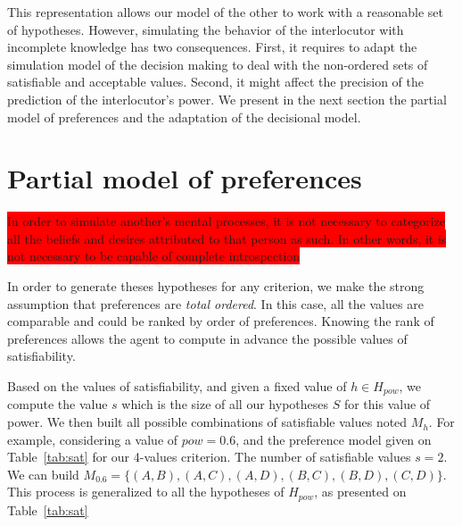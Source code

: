 \documentclass[conference, letterpaper]{IEEEtran}
\begin{document}
	This representation allows our model of the other to work with a reasonable set of hypotheses.  
	However, simulating the behavior of the interlocutor with incomplete knowledge has two consequences. First, it requires to adapt the simulation model of the decision making to deal with the non-ordered sets of satisfiable and acceptable values. Second, it might affect the precision of the prediction of the interlocutor's power.
	We present in the next section the partial model of preferences and the adaptation of the decisional model.
	
	\section{Partial model of preferences}
			\colorbox{red}{In order to simulate another’s mental processes,
		it is not necessary to categorize all the beliefs and
		desires attributed to that person as such. In other words, it
		is not necessary to be capable of complete introspection %
	}
	
	In order to generate theses hypotheses for any criterion, we make the strong assumption that preferences are \emph{total ordered}. In this case, all the values are comparable and could be ranked by order of preferences. Knowing the rank of preferences allows the agent to compute in advance the possible values of satisfiability.
	
	Based on the values of satisfiability, and given a fixed value of $h \in H_{pow}$, we compute the value $s$ which is the size of all our hypotheses $S$ for this value of power. We then built all possible combinations of satisfiable values  noted $M_h$. For example, considering a value of $pow =0.6$, and the preference model given on Table~\ref{tab:sat} for our 4-values criterion. The number of satisfiable values $s=2$. We can build $M_{0.6} = \{(A,B), (A,C), (A,D), (B,C), (B,D), (C,D)\}$. This process is generalized to all the hypotheses of $H_{pow}$, as presented on Table~\ref{tab:sat}
	
\end{document}
